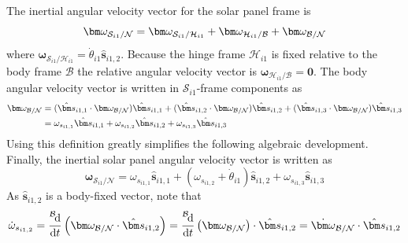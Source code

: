 The inertial angular velocity vector for the solar panel frame is
\begin{equation}
	\bm\omega_{\mathcal{S}_{i1}/\mathcal{N}} = \bm\omega_{\mathcal{S}_{i1}/\mathcal{H}_{i1}} + \bm\omega_{\mathcal{H}_{i1}/\mathcal{B}} + \bm\omega_{\cal B/N}
\end{equation}
where $\bm\omega_{\mathcal{S}_{i1}/\mathcal{H}_{i1}} = \dot\theta_{i1} \hat{\bm s}_{i1,2}$.
Because the hinge frame $\mathcal{H}_{i1}$ is fixed relative to the body frame $\mathcal{B}$ the relative angular velocity vector is $\bm\omega_{\mathcal{H}_{i1}/\mathcal{B}} = \bm 0$.  The body angular velocity vector is written in $\mathcal{S}_{i1}$-frame components as
\begin{align}
	\bm\omega_{\cal B/N} &= ( \hat{\bm s}_{i1,1} \cdot \bm\omega_{\cal B/N}) \hat{\bm s}_{i1,1}
	+ (\hat{\bm s}_{i1,2} \cdot\bm\omega_{\cal B/N}) \hat{\bm s}_{i1,2}
	+ (\hat{\bm s}_{i1,3} \cdot\bm\omega_{\cal B/N}) \hat{\bm s}_{i1,3}
	\\
	&= \omega_{s_{i1,1}} \hat{\bm s}_{i1,1} + \omega_{s_{i1,2}} \hat{\bm s}_{i1,2} + \omega_{s_{i1,3}}\hat{\bm s}_{i1,3}
\end{align}
Using this definition greatly simplifies the following algebraic development.  Finally, the inertial solar panel angular velocity vector is written as
\begin{equation}
	\bm\omega_{\mathcal{S}_{i1}/\mathcal{N}}  = \omega_{s_{i1,1}} \hat{\bm s}_{{i1},1} + (\omega_{s_{i1,2}} + \dot\theta_{i1})\hat{\bm s}_{i1,2} + \omega_{s_{i1,3}} \hat{\bm s}_{i1,3}
\end{equation}
As $\hat{\bm s}_{i1,2}$ is a body-fixed vector, note that
\begin{equation}
	\dot\omega_{s_{i1,2}} = \frac{\leftexp{B}\D}{\D t} \left( \bm\omega_{\cal B/N} \cdot \hat{\bm s}_{i1,2} \right)
	= \frac{\leftexp{B}\D}{\D t} \left( \bm\omega_{\cal B/N}\right) \cdot \hat{\bm s}_{i1,2}  =
	\dot{\bm\omega}_{\cal B/N} \cdot \hat{\bm s}_{i1,2}
\end{equation}

